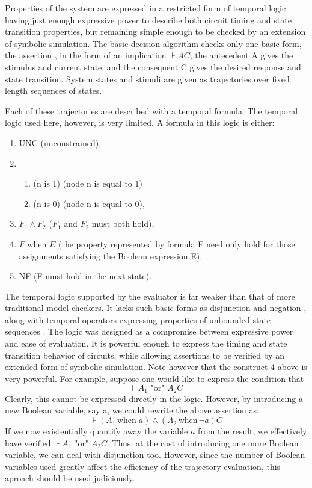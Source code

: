 Properties of the system are expressed in a restricted form of
temporal logic%
%
{} having just enough expressive power to describe both
circuit timing and state transition properties, but remaining simple
enough to be checked by an extension of symbolic simulation. The
basic decision algorithm checks only one basic form, the assertion%
%
{},
in the form of an implication $\assert{A}{C}$; the antecedent A gives the
stimulus and current state, and the consequent C gives the desired
response and state transition. System states and stimuli are given
as trajectories%
%
{} over fixed length sequences of states.

Each of these trajectories are described with a temporal formula.
The temporal logic used here, however, is very limited. A formula
in this logic is either:
\begin{enumerate}
\item
UNC (unconstrained), 
\item
\begin{enumerate}
\item
(n is 1) (node n is equal to 1)
\item
(n is 0) (node n is equal to 0),
\end{enumerate}
\item
$F_1 \wedge F_2$ ($F_1$ and $F_2$ must both hold),
\item
$F$ when $E$ (the property represented by formula F need only hold for
those assignments satisfying the Boolean expression E),
\item
NF (F must hold in the next state).
\end{enumerate}

The temporal logic supported by the evaluator is far weaker than
that of more traditional model checkers. It lacks such basic forms
as disjunction%
%
{} and negation%
%
{}, along with temporal operators expressing
properties of unbounded state sequences%
%
{}. The logic was designed as
a compromise between expressive power and ease of evaluation. It
is powerful enough to express the timing and state transition
behavior of circuits, while allowing assertions to be verified by
an extended form of symbolic simulation. Note however that the
construct 4 above is very powerful.  For example, suppose one would
like to express the condition that
\[
\assert{A_1 \mbox{ "or" } A_2}{C}
\]
Clearly, this cannot be expressed directly in the logic. However,
by introducing a new Boolean variable, say a, we could rewrite the
above assertion as:
\[
\assert{(A_1 \,\mbox{when}\; a)\wedge (A_2 \,\mbox{when}\, \neg a)}{C}
\]
If we now existentially quantify%
%
{} away the variable $a$ from the result, 
we effectively have verified $\assert{A_1 \mbox{ "or" } A_2}{C}$.
Thus, at the cost of introducing one more Boolean variable, we can
deal with disjunction too.
However, since the number of Boolean variables used greatly affect
the efficiency of the trajectory evaluation, this aproach should
be used judiciously.

